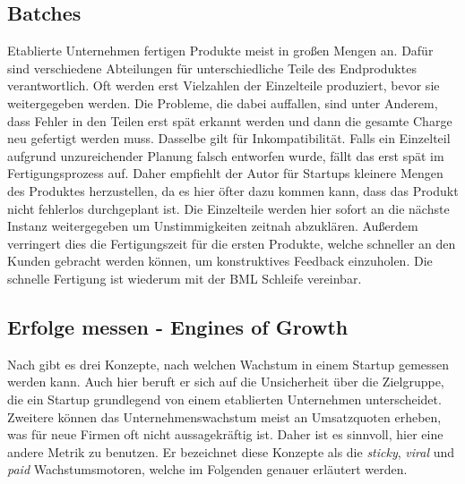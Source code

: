 \subsection*{\label{sec:LeanStartup-Batches}\thesubsection\quad Batches}
Etablierte Unternehmen fertigen Produkte meist in großen Mengen an. Dafür sind verschiedene Abteilungen für unterschiedliche Teile des Endproduktes verantwortlich. Oft werden erst Vielzahlen der Einzelteile produziert, bevor sie weitergegeben werden. Die Probleme, die \citeauthor{TheLeanStartup} dabei auffallen, sind unter Anderem, dass Fehler in den Teilen erst spät erkannt werden und dann die gesamte Charge neu gefertigt werden muss. Dasselbe gilt für Inkompatibilität. Falls ein Einzelteil aufgrund unzureichender Planung falsch entworfen wurde, fällt das erst spät im Fertigungsprozess auf. Daher empfiehlt der Autor für Startups kleinere Mengen des Produktes herzustellen, da es hier öfter dazu kommen kann, dass das Produkt nicht fehlerlos durchgeplant ist. Die Einzelteile werden hier sofort an die nächste Instanz weitergegeben um Unstimmigkeiten zeitnah abzuklären. Außerdem verringert dies die Fertigungszeit für die ersten Produkte, welche schneller an den Kunden gebracht werden können, um konstruktives Feedback einzuholen. Die schnelle Fertigung ist wiederum mit der \ac{BML} Schleife vereinbar.

\subsection*{\label{sec:LeanStartup-EnginesOfGrowth}\thesubsection\quad Erfolge messen - Engines of Growth}
Nach \citeauthor{TheLeanStartup} gibt es drei Konzepte, nach welchen Wachstum in einem Startup gemessen werden kann. Auch hier beruft er sich auf die Unsicherheit über die Zielgruppe, die ein Startup grundlegend von einem etablierten Unternehmen unterscheidet. Zweitere können das Unternehmenswachstum meist an Umsatzquoten erheben, was für neue Firmen oft nicht aussagekräftig ist. Daher ist es sinnvoll, hier eine andere Metrik zu benutzen. Er bezeichnet diese Konzepte als die \textit{sticky}, \textit{viral} und \textit{paid} Wachstumsmotoren, welche im Folgenden genauer erläutert werden.

